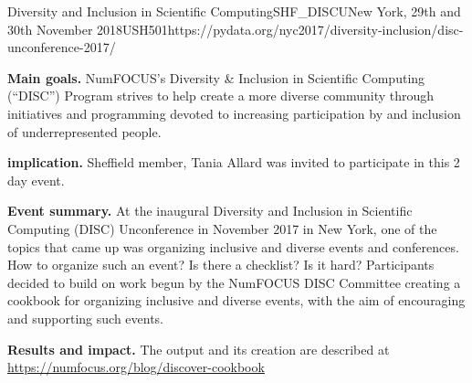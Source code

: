 \begin{event}{Diversity and Inclusion in Scientific Computing}{SHF_DISCU}{New York, 29th and 30th November 2018}{USH}{50}{1}{https://pydata.org/nyc2017/diversity-inclusion/disc-unconference-2017/}

\textbf{Main goals.} NumFOCUS's Diversity \& Inclusion in Scientific Computing (``DISC'') Program strives to help create a more diverse community through initiatives and programming devoted to increasing participation by and inclusion of underrepresented people.

\textbf{\ODK implication.} \ODK Sheffield member, Tania Allard was invited to participate in this 2 day event.

\textbf{Event summary.} At the inaugural Diversity and Inclusion in Scientific Computing (DISC) Unconference in November 2017 in New York, one of the topics that came up was organizing inclusive and diverse events and conferences. How to organize such an event? Is there a checklist? Is it hard? Participants decided to build on work begun by the NumFOCUS DISC Committee creating a cookbook for organizing inclusive and diverse events, with the aim of encouraging and supporting such events.

\textbf{Results and impact.} The output and its creation are described at \url{https://numfocus.org/blog/discover-cookbook}

\end{event}
